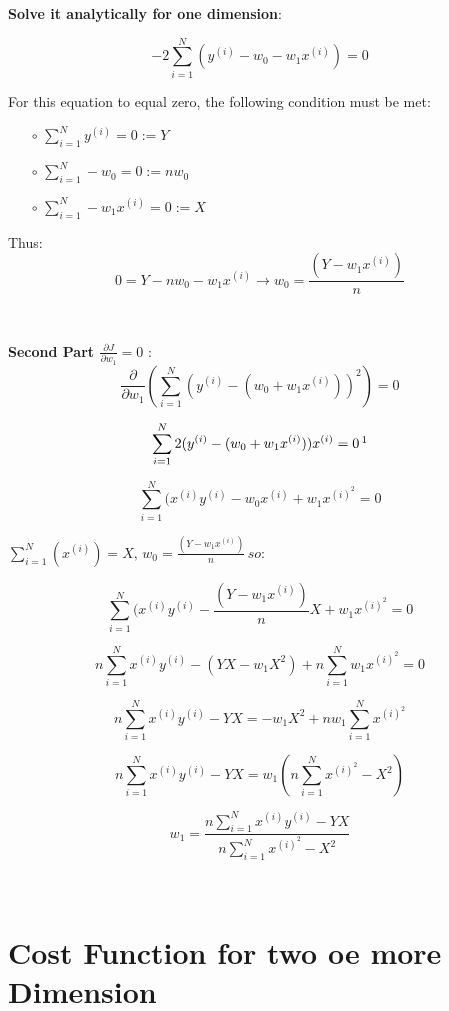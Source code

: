 \documentclass{article}
\newenvironment{cheatformula}[1][כותרת]{
    \begin{minipage}{\linewidth}
    \textbf{#1}:
}{
    \end{minipage}\\[0ex]
}
\begin{document}
\begin{multicols*}{2}
\begin{cheatformula}[Solve it analytically for one dimension]
 $$ -2 \sum_{i=1}^{N}(y^{(i)} -  w_{0} - w_{1}x^{(i)}) = 0 $$

For this equation to equal zero, the following condition must be met:
\begin{itemize}
\item[$\circ$] $\sum_{i=1}^{N}y^{(i)} = 0 := Y$ 
\item[$\circ$] $\sum_{i=1}^{N}-w_{0}  = 0 := n w_{0} $ 
\item[$\circ$] $\sum_{i=1}^{N}-w_{1}x^{(i)}  = 0 := X $ 
\end{itemize}
Thus:
$$ 0 = Y - n w_{0} -w_{1}x^{(i)} \longrightarrow  w_{0} = \frac{(Y -w_{1}x^{(i)})}{n} $$
\end{cheatformula}


\begin{cheatformula}[Second Part $\frac{\partial J}{\partial w_{1}} = 0$ ]\\

$$ \frac{\partial }{\partial w_{1}}  ( \sum_{i=1}^{N}(y^{(i)} -  (w_{0} + w_{1}x^{(i)}))^{2}) = 0   $$

$$  \sum_{i=1}^{N} 2(y^{(i)} -  (w_{0} + w_{1}x^{(i)})) x^{(i)} = 0  \, \footnotemark $$

$$  \sum_{i=1}^{N} (x^{(i)}y^{(i)} - w_{0}x^{(i)} + w_{1}x^{(i)^{2}} = 0 $$

$ \sum_{i=1}^{N} (x^{(i)})=X   ,\,  w_{0} = \frac{(Y -w_{1}x^{(i)})}{n} \, so: $

$$  \sum_{i=1}^{N} (x^{(i)}y^{(i)} - \frac{(Y -w_{1}x^{(i)})}{n} X  + w_{1}x^{(i)^{2}} = 0 $$

$$  n \sum_{i=1}^{N} x^{(i)}y^{(i)} - {(YX -w_{1}X^{2})}   + n\sum_{i=1}^{N}w_{1}x^{(i)^{2}} = 0 $$

$$  n \sum_{i=1}^{N} x^{(i)}y^{(i)} - YX=  - w_{1}X^{2}   + n w_{1}\sum_{i=1}^{N}x^{(i)^{2}}  $$

$$n \sum_{i=1}^{N} x^{(i)}y^{(i)} - YX = w_{1} (n \sum_{i=1}^{N}x^{(i)^{2}} - X^{2})$$

$$w_{1} = \frac{n \sum_{i=1}^{N} x^{(i)}y^{(i)} - YX}{n \sum_{i=1}^{N}x^{(i)^{2}} - X^{2}}$$

 
\end{cheatformula}
\pagebreak


\section{Cost Function for two oe more Dimension}


\end{multicols*}
\end{document}
